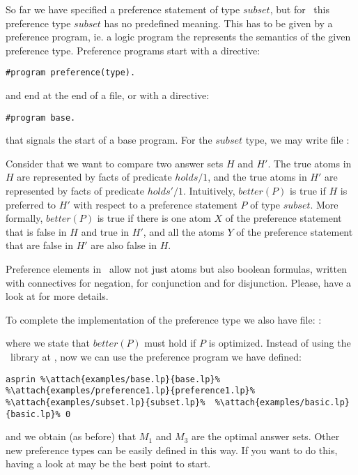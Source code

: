 So far we have specified a preference statement of type $subset$, 
but for \asprin\ this preference type $subset$ has no predefined meaning. 
This has to be given by a preference program,  ie. a logic program the represents the semantics of the given preference type. 
Preference programs start with a directive: 
\begin{lstlisting}[numbers=none]
#program preference(type).
\end{lstlisting}
and end at the end of a file, or with a directive:  
\begin{lstlisting}[numbers=none]
#program base.
\end{lstlisting}
that signals the start of a base program. 
For the $subset$ type, we may write file 
: 

Consider that we want to compare two answer sets $H$ and $H'$. 
The true atoms in $H$ are represented by facts of predicate $holds/1$,  and the true atoms in $H'$ are represented by facts of predicate $holds'/1$. 
Intuitively, $better(P)$ is true if $H$ is preferred to $H'$ with respect to a preference statement $P$ of type $subset$. 
More formally, 
$better(P)$ is true if there is one atom $X$ of the preference statement that is false in $H$ and true in $H'$, 
and all the atoms $Y$ of the preference statement that are false in $H'$ are also false in $H$.  

\begin{note}
Preference elements in \asprin\ allow not just atoms 
but also boolean formulas, written with connectives \code{\~} for negation, 
\code{\&} for conjunction and \code{|} for disjunction.
Please, have a look at \cite{brderosc15a} for more details. 
\eexample
\end{note}

To complete the implementation of the preference type we also have file: 
: 

where we state that $better(P)$ must hold if $P$ is optimized. 
Instead of using the \asprin\ library at , 
now we can use the preference program we have defined:
\begin{lstlisting}[numbers=none,escapechar=\%]
asprin %\attach{examples/base.lp}{base.lp}% %\attach{examples/preference1.lp}{preference1.lp}%  %\attach{examples/subset.lp}{subset.lp}%  %\attach{examples/basic.lp}{basic.lp}% 0
\end{lstlisting}
and we obtain (as before) that $M_1$ and $M_3$ are the optimal answer sets.
Other new preference types can be easily defined in this way.  
If you want to do this, having a look at  may be the best point to start. 

